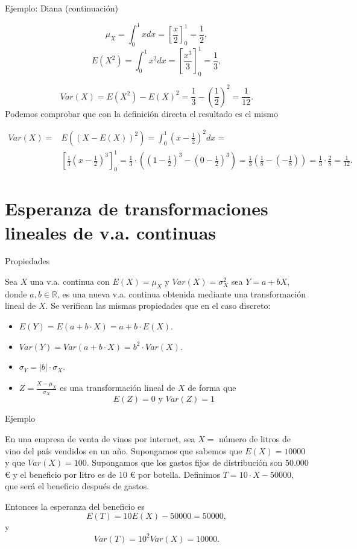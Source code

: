 \documentclass[
  letterpaper,
  DIV=11,
  numbers=noendperiod]{scrreprt}
\providecommand{\tightlist}{%
  \setlength{\itemsep}{0pt}\setlength{\parskip}{0pt}}\usepackage{longtable,booktabs,array}
\begin{document}
\begin{Ejemplo}{Ejemplo: Diana (continuación)}{}

\[\mu_{X}=  \int_0^1 x  dx=\left[\frac{x}{2}\right]_0^1=\frac12,\]
\[E(X^2)=\int_0^1 x^2 dx=\left[\frac{x^3}{3}\right]_0^1=\frac13,\]

\[Var(X)=E(X^2)-E(X)^2=\frac13-\left(\frac12\right)^2=\frac1{12}.\]
Podemos comprobar que con la definición directa el resultado es el mismo

\begin{align*}
Var(X)= & E\left(\left(X-E(X)\right)^2\right)=
\int_0^1 \left(x-\frac12\right)^2 dx= \\ & 
\left[\frac13 \left(x-\frac12\right)^3\right]_0^1= 
\frac13\cdot \left(\left(1-\frac12\right)^3-\left(0-\frac12\right)^3\right)
= \frac13\left(\frac18-\left(-\frac18\right)\right)=\frac13\cdot \frac28=\frac1{12}.
\end{align*}

\end{Ejemplo}

\section{Esperanza de transformaciones lineales de v.a.
continuas}\label{esperanza-de-transformaciones-lineales-de-v.a.-continuas}

\begin{Proposicion}{Propiedades}{}

Sea \(X\) una v.a. continua con \(E(X)=\mu_{X}\) y
\(Var(X)=\sigma_{X}^2\) sea \(Y=a+b X\), donde \(a,b\in\mathbb{R}\), es
una nueva v.a. continua obtenida mediante una transformación lineal de
\(X\). Se verifican las mismas propiedades que en el caso discreto:

\begin{itemize}
\tightlist
\item
  \(E(Y)=E(a+b\cdot  X)=a+b\cdot  E(X)\).
\item
  \(Var(Y)=Var(a+b\cdot  X)=b^2 \cdot  Var(X)\).
\item
  \(\sigma_{Y}=|b|\cdot  \sigma_{X}\).
\item
  \(Z=\frac{X-\mu_{X}}{\sigma_{X}}\) es una transformación lineal de
  \(X\) de forma que \[E(Z)=0 \mbox{ y } Var(Z)=1\]
\end{itemize}

\end{Proposicion}

\begin{Ejemplo}{Ejemplo}{}

En una empresa de venta de vinos por internet, sea \(X=\) número de
litros de vino del país vendidos en un año. Supongamos que sabemos que
\(E(X)=10000\) y que \(Var(X)=100.\) Supongamos que los gastos fijos de
distribución son 50.000 € y el beneficio por litro es de 10 € por
botella. Definimos \(T=10\cdot X-50000,\) que será el beneficio después
de gastos.

Entonces la esperanza del beneficio es \[E(T)=10 E(X)-50000 = 50000,\] y
\[Var(T)=10^2 Var(X)= 10000.\]

\end{Ejemplo}
\end{document}
